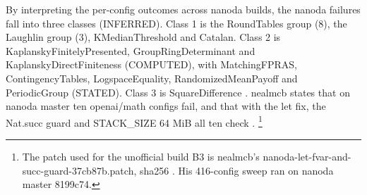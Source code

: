 By interpreting the per-config outcomes across nanoda builds, the nanoda failures fall into three classes (INFERRED).
Class 1 is the RoundTables group (8), the Laughlin group (3), KMedianThreshold and Catalan.
Class 2 is KaplanskyFinitelyPresented, GroupRingDeterminant and KaplanskyDirectFiniteness (COMPUTED), with MatchingFPRAS, ContingencyTables, LogspaceEquality, RandomizedMeanPayoff and PeriodicGroup (STATED).
Class 3 is SquareDifference \cite{nanoda-issue-62}.
nealmcb states that on nanoda master ten openai/math configs fail, and that with the let fix, the Nat.succ guard and STACK\_SIZE 64 MiB all ten check \cite{nanoda-issue-61}.
\footnote{The patch used for the unofficial build B3 is nealmcb's nanoda-let-fvar-and-succ-guard-37cb87b.patch, sha256 .
His 416-config sweep ran on nanoda master 8199c74.
}
